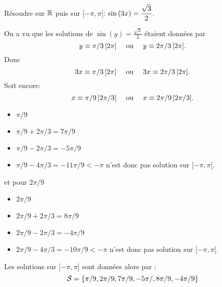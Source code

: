 \documentclass[a4paper, 11pt]{article}
\begin{document}
\begin{center}
\end{center}


\begin{exemple}
R\'esoudre sur $\mathbb{R}$ puis sur $\lbrack -\pi,\pi\lbrack$: $\sin{(3x)}= \displaystyle \frac{\sqrt{3}}{2}$.

\end{exemple}
\begin{cor}
On a vu que les solutions de $\sin(y) = \frac{\sqrt{3}}{2}$ étaient données par 
$$y \equiv \pi/3\, [2\pi] \quad \text{ ou } \quad  y \equiv 2\pi/3\, [2\pi].$$
Donc 
$$3x \equiv \pi/3\, [2\pi] \quad \text{ ou } \quad  3x \equiv 2\pi/3\, [2\pi].$$
Soit encore: 
$$x \equiv \pi/9\, [2\pi/3] \quad \text{ ou } \quad  x \equiv 2\pi/9\, [2\pi/3].$$


\begin{itemize}
\item $\pi/9$
\item $\pi/9 +2\pi/3 = 7\pi/9$
  \item $\pi/9 -2\pi/3 = -5\pi/9$
    \item $\pi/9 -4\pi/3 = -11\pi/9<-\pi$ n'est donc pas solution sur $[-\pi, \pi[$. 
\end{itemize}
et  pour $2\pi/9$
\begin{itemize}
\item $2\pi/9$
\item $2\pi/9 +2\pi/3 = 8\pi/9$
  \item $2\pi/9 -2\pi/3 = -4\pi/9$
    \item $2\pi/9 -4\pi/3 = -10\pi/9<-\pi$ n'est donc pas solution sur $[-\pi, \pi[$. 
\end{itemize}

Les solutions sur $[-\pi , \pi[$ sont données alors par : 
$$\mathcal{S}=\{ \pi/9,2\pi/9, 7\pi/9 ,-5\pi/,8\pi/9 ,-4\pi/9  \}$$ 


\end{cor}
\end{document}
